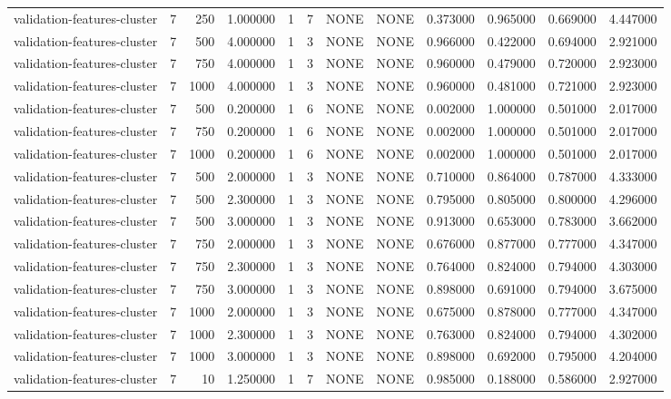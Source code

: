 \begin{tabular}{lrrrllllrrrr}
validation-features-cluster & 7 & 250 & 1.000000 & 1 & 7 & NONE & NONE & 0.373000 & 0.965000 & 0.669000 & 4.447000 \\
validation-features-cluster & 7 & 500 & 4.000000 & 1 & 3 & NONE & NONE & 0.966000 & 0.422000 & 0.694000 & 2.921000 \\
validation-features-cluster & 7 & 750 & 4.000000 & 1 & 3 & NONE & NONE & 0.960000 & 0.479000 & 0.720000 & 2.923000 \\
validation-features-cluster & 7 & 1000 & 4.000000 & 1 & 3 & NONE & NONE & 0.960000 & 0.481000 & 0.721000 & 2.923000 \\
validation-features-cluster & 7 & 500 & 0.200000 & 1 & 6 & NONE & NONE & 0.002000 & 1.000000 & 0.501000 & 2.017000 \\
validation-features-cluster & 7 & 750 & 0.200000 & 1 & 6 & NONE & NONE & 0.002000 & 1.000000 & 0.501000 & 2.017000 \\
validation-features-cluster & 7 & 1000 & 0.200000 & 1 & 6 & NONE & NONE & 0.002000 & 1.000000 & 0.501000 & 2.017000 \\
validation-features-cluster & 7 & 500 & 2.000000 & 1 & 3 & NONE & NONE & 0.710000 & 0.864000 & 0.787000 & 4.333000 \\
validation-features-cluster & 7 & 500 & 2.300000 & 1 & 3 & NONE & NONE & 0.795000 & 0.805000 & 0.800000 & 4.296000 \\
validation-features-cluster & 7 & 500 & 3.000000 & 1 & 3 & NONE & NONE & 0.913000 & 0.653000 & 0.783000 & 3.662000 \\
validation-features-cluster & 7 & 750 & 2.000000 & 1 & 3 & NONE & NONE & 0.676000 & 0.877000 & 0.777000 & 4.347000 \\
validation-features-cluster & 7 & 750 & 2.300000 & 1 & 3 & NONE & NONE & 0.764000 & 0.824000 & 0.794000 & 4.303000 \\
validation-features-cluster & 7 & 750 & 3.000000 & 1 & 3 & NONE & NONE & 0.898000 & 0.691000 & 0.794000 & 3.675000 \\
validation-features-cluster & 7 & 1000 & 2.000000 & 1 & 3 & NONE & NONE & 0.675000 & 0.878000 & 0.777000 & 4.347000 \\
validation-features-cluster & 7 & 1000 & 2.300000 & 1 & 3 & NONE & NONE & 0.763000 & 0.824000 & 0.794000 & 4.302000 \\
validation-features-cluster & 7 & 1000 & 3.000000 & 1 & 3 & NONE & NONE & 0.898000 & 0.692000 & 0.795000 & 4.204000 \\
validation-features-cluster & 7 & 10 & 1.250000 & 1 & 7 & NONE & NONE & 0.985000 & 0.188000 & 0.586000 & 2.927000 \\

\end{tabular}
